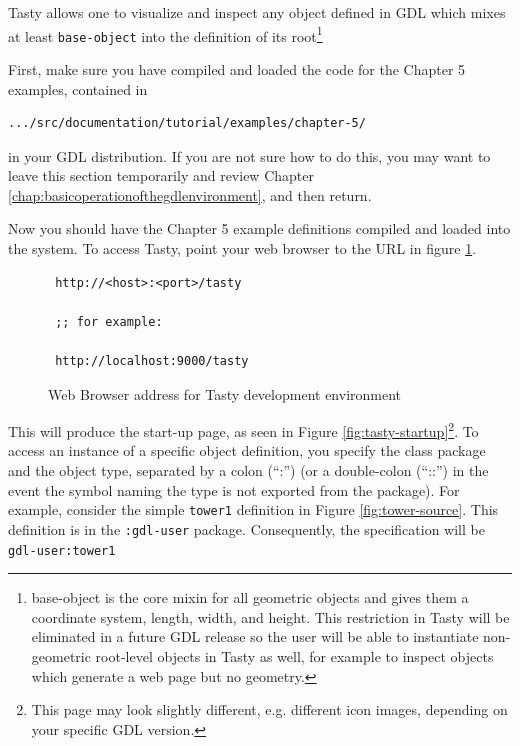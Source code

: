 \documentclass [11pt]{book}
\begin{document}
Tasty allows one to visualize and inspect any object defined
in GDL which mixes at least \texttt{base-object} into the definition of its root\footnote{base-object is the core mixin for all geometric
objects and gives them a coordinate system, length, width, and
height. This restriction in Tasty will be eliminated in a future GDL
release so the user will be able to instantiate non-geometric
root-level objects in Tasty as well, for example to inspect objects
which generate a web page but no geometry.}



First, make sure you have compiled and loaded the code for
the Chapter 5 examples, contained in 

\begin{verbatim}.../src/documentation/tutorial/examples/chapter-5/
\end{verbatim} in your GDL distribution. If you are not sure how to do this,
you may want to leave this section temporarily and review Chapter 
\ref{chap:basicoperationofthegdlenvironment}, and then return.



Now you should have the Chapter 5 example definitions
compiled and loaded into the system. To access Tasty, point your web
browser to the URL in figure
\ref{fig:tasty-toplevel-url}.
\begin{figure}
\begin{lrbox}{\boxedverb}
\begin{minipage}{\linewidth}

\begin{verbatim}
 http://<host>:<port>/tasty

 ;; for example:

 http://localhost:9000/tasty
\end{verbatim}
\end{minipage}
\end{lrbox}
\fbox{\usebox{\boxedverb}}

\caption{Web Browser address for Tasty development environment}

\label{fig:tasty-toplevel-url}

\end{figure}
This will produce the start-up page, as seen in Figure 
\ref{fig:tasty-startup}\footnote{This page may look slightly different, e.g. different
icon images, depending on your specific GDL version.}. To access an instance of a specific object definition,
you specify the class package and the object type, separated by a
colon (``:'') (or a double-colon (``::'') in the event the symbol
naming the type is not exported from the package). For example,
consider the simple \texttt{tower1} definition in Figure 
\ref{fig:tower-source}. This definition is in the \texttt{:gdl-user} package. Consequently, the specification will be \texttt{gdl-user:tower1}
\end{document}
